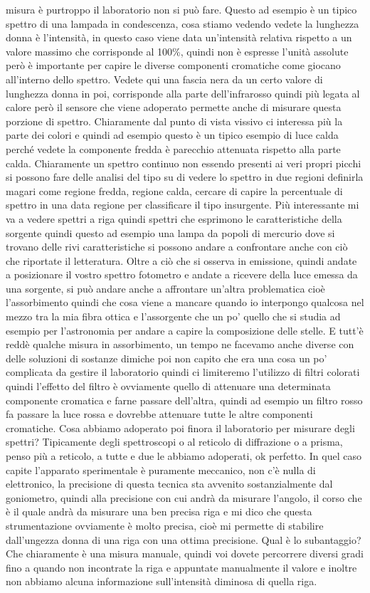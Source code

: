 misura è purtroppo il laboratorio non si può fare. Questo ad esempio è un tipico spettro di una lampada in condescenza, cosa stiamo vedendo vedete la lunghezza donna è l'intensità, in questo caso viene data un'intensità relativa rispetto a un valore massimo che corrisponde al 100\%, quindi non è espresse l'unità assolute però è importante per capire le diverse componenti cromatiche come giocano all'interno dello spettro. Vedete qui una fascia nera da un certo valore di lunghezza donna in poi, corrisponde alla parte dell'infrarosso quindi più legata al calore però il sensore che viene adoperato permette anche di misurare questa porzione di spettro. Chiaramente dal punto di vista vissivo ci interessa più la parte dei colori e quindi ad esempio questo è un tipico esempio di luce calda perché vedete la componente fredda è parecchio attenuata rispetto alla parte calda. Chiaramente un spettro continuo non essendo presenti ai veri propri picchi si possono fare delle analisi del tipo su di vedere lo spettro in due regioni definirla magari come regione fredda, regione calda, cercare di capire la percentuale di spettro in una data regione per classificare il tipo insurgente. Più interessante mi va a vedere spettri a riga quindi spettri che esprimono le caratteristiche della sorgente quindi questo ad esempio una lampa da popoli di mercurio dove si trovano delle rivi caratteristiche si possono andare a confrontare anche con ciò che riportate il letteratura. Oltre a ciò che si osserva in emissione, quindi andate a posizionare il vostro spettro fotometro e andate a ricevere della luce emessa da una sorgente, si può andare anche a affrontare un'altra problematica cioè l'assorbimento quindi che cosa viene a mancare quando io interpongo qualcosa nel mezzo tra la mia fibra ottica e l'assorgente che un po' quello che si studia ad esempio per l'astronomia per andare a capire la composizione delle stelle. E tutt'è reddè qualche misura in assorbimento, un tempo ne facevamo anche diverse con delle soluzioni di sostanze dimiche poi non capito che era una cosa un po' complicata da gestire il laboratorio quindi ci limiteremo l'utilizzo di filtri colorati quindi l'effetto del filtro è ovviamente quello di attenuare una determinata componente cromatica e farne passare dell'altra, quindi ad esempio un filtro rosso fa passare la luce rossa e dovrebbe attenuare tutte le altre componenti cromatiche. Cosa abbiamo adoperato poi finora il laboratorio per misurare degli spettri? Tipicamente degli spettroscopi o al reticolo di diffrazione o a prisma, penso più a reticolo, a tutte e due le abbiamo adoperati, ok perfetto. In quel caso capite l'apparato sperimentale è puramente meccanico, non c'è nulla di elettronico, la precisione di questa tecnica sta avvenito sostanzialmente dal goniometro, quindi alla precisione con cui andrà da misurare l'angolo, il corso che è il quale andrà da misurare una ben precisa riga e mi dico che questa strumentazione ovviamente è molto precisa, cioè mi permette di stabilire dall'ungezza donna di una riga con una ottima precisione. Qual è lo subantaggio? Che chiaramente è una misura manuale, quindi voi dovete percorrere diversi gradi fino a quando non incontrate la riga e appuntate manualmente il valore e inoltre non abbiamo alcuna informazione sull'intensità diminosa di quella riga. 